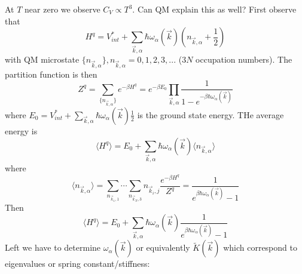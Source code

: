 \documentclass[12pt, a4paper, oneside, openright, titlepage]{book}
\begin{document}
At $T$ near zero we observe $C_V\propto T^3$. Can QM explain this as well? First observe that \begin{equation*}
    H^q = V_{int}^* + \sum_{\vec{k},\alpha}\hbar\omega_{\alpha}(\vec{k})\left(n_{\vec{k},\alpha}+\frac{1}{2}\right)
\end{equation*}
with QM microstate $\{n_{\vec{k},\alpha}\}, n_{\vec{k},\alpha} = 0,1,2,3,...$ ($3N$ occupation numbers). The partition function is then \begin{equation*}
    Z^q = \sum_{\{n_{\vec{k},\alpha}\}}e^{-\beta H^q} = e^{-\beta E_0}\prod_{\vec{k},\alpha}\frac{1}{1-e^{-\beta\hbar\omega_{\alpha}(\vec{k})}}
\end{equation*}
where $E_0 = V_{int}^* + \sum_{\vec{k},\alpha}\hbar\omega_{\alpha}(\vec{k})\frac{1}{2}$ is the ground state energy. THe average energy is \begin{equation*}
    \langle H^q\rangle = E_0+\sum_{\vec{k},\alpha}\hbar\omega_{\alpha}(\vec{k})\langle n_{\vec{k},\alpha}\rangle
\end{equation*}
where \begin{equation*}
    \langle n_{\vec{k},\alpha}\rangle = \sum_{n_{\vec{k}_1,1}}\cdots\sum_{n_{\vec{k}_N,3}}n_{\vec{k}_i,j}\frac{e^{-\beta H^q}}{Z^q}  = \frac{1}{e^{\beta\hbar\omega_{\alpha}(\vec{k})} - 1}
\end{equation*}
Then \begin{equation*}
    \langle H^q\rangle = E_0+\sum_{\vec{k},\alpha}\hbar\omega_{\alpha}(\vec{k})\frac{1}{e^{\beta\hbar\omega_{\alpha}(\vec{k})}-1}
\end{equation*}
Left we have to determine $\omega_{\alpha}(\vec{k})$ or equivalently $\tilde{K}(\vec{k})$ which correspond to eigenvalues or spring constant/stiffness:
\end{document}
